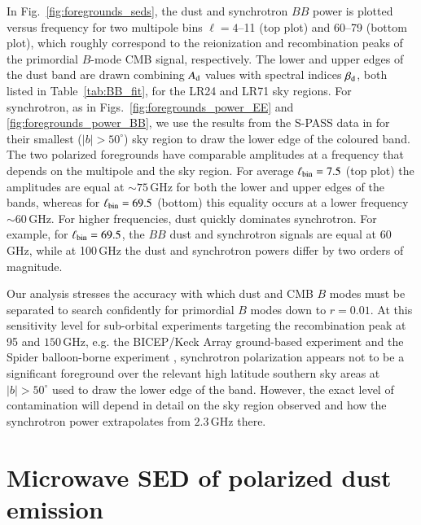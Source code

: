 \documentclass[longauth,traditabstract]{aa}
\newcommand{\ellbin}{\ell_{\rm bin}}
\begin{document}
In Fig.~\ref{fig:foregrounds_seds}, the dust and synchrotron $BB$ power is plotted versus frequency for 
two multipole bins $\ell = 4$--11 (top plot) and 60--79 (bottom plot), which roughly correspond to the reionization and recombination peaks of the primordial $B$-mode
CMB signal, respectively.  The lower and upper edges of the dust band are drawn combining $A_{\rm d}$ values with spectral indices 
 $\beta_{\rm d}$, both listed in Table~\ref{tab:BB_fit}, for the LR24 and LR71 sky regions.  
%
For synchrotron, as in Figs.~\ref{fig:foregrounds_power_EE} and \ref{fig:foregrounds_power_BB}, we use the 
results from the S-PASS data in \citet{Krachmalnicoff18} for their smallest ($|b|>50^\circ$) sky region to draw the lower edge of the coloured band. 
The two polarized foregrounds have comparable amplitudes at a frequency that depends on the multipole and the sky region.
For average $\ellbin = 7.5$ (top plot) the amplitudes are equal at $\sim 75\,$GHz for both the lower and upper edges of the bands, whereas
 for $\ellbin = 69.5$ (bottom) this equality occurs at a lower frequency $\sim 60\,$GHz.
%
For higher frequencies, dust quickly dominates synchrotron. For example, for $\ellbin = 69.5$,  the $BB$ dust and synchrotron signals are equal at $60\,$GHz, while at 100\,GHz
the dust and synchrotron powers differ by two orders of magnitude. 

Our analysis stresses the accuracy with which dust and CMB $B$ modes must be separated to 
search confidently for primordial $B$ modes down to $r =0.01$. 
At this sensitivity level for sub-orbital experiments targeting the recombination peak at 95 and $150\,$GHz, e.g. the BICEP/Keck Array ground-based experiment \citep{PhysRevLett.116.031302} 
and the Spider balloon-borne experiment \citep{Fraisse13}, synchrotron polarization appears not to be a significant foreground over the relevant high latitude southern sky areas at $|b|>50^\circ$ 
used to draw the lower edge of the band.  However, the exact level of contamination will depend in detail on the sky region observed and how the synchrotron power extrapolates from $2.3\,$GHz there.

\section{Microwave SED of polarized dust emission}
\label{sec:betaT}
\end{document}
